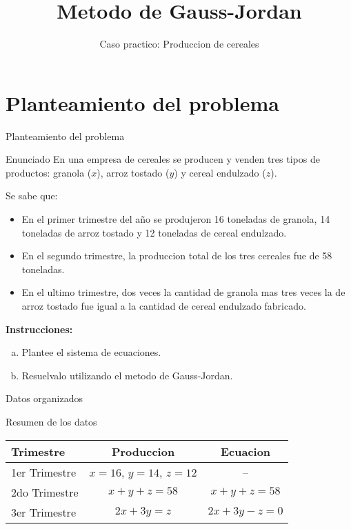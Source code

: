 \documentclass{beamer}
\title{Metodo de Gauss-Jordan}
\subtitle{Caso practico: Produccion de cereales}
\begin{document}
\section{Planteamiento del problema}

\begin{frame}{Planteamiento del problema}
\begin{block}{Enunciado}
\footnotesize
En una empresa de cereales se producen y venden tres tipos de productos: granola ($x$), arroz tostado ($y$) y cereal endulzado ($z$).

Se sabe que:
\begin{itemize}
    \item En el primer trimestre del año se produjeron 16 toneladas de granola, 14 toneladas de arroz tostado y 12 toneladas de cereal endulzado.
    \item En el segundo trimestre, la produccion total de los tres cereales fue de 58 toneladas.
    \item En el ultimo trimestre, dos veces la cantidad de granola mas tres veces la de arroz tostado fue igual a la cantidad de cereal endulzado fabricado.
\end{itemize}

\textbf{Instrucciones:}
\begin{enumerate}[a.]
    \item Plantee el sistema de ecuaciones.
    \item Resuelvalo utilizando el metodo de Gauss-Jordan.
\end{enumerate}
\end{block}
\end{frame}

\begin{frame}{Datos organizados}
\begin{block}{Resumen de los datos}
\begin{table}[h]
\centering
\renewcommand{\arraystretch}{1.4}
\begin{tabular}{lcc}
\toprule
\textbf{Trimestre} & \textbf{Produccion} & \textbf{Ecuacion} \\
\midrule
1er Trimestre & $x=16$, $y=14$, $z=12$ & -- \\
2do Trimestre & $x+y+z=58$ & $x + y + z = 58$ \\
3er Trimestre & $2x + 3y = z$ & $2x + 3y - z = 0$ \\
\bottomrule
\end{tabular}
\end{table}
\end{block}
\end{frame}
\end{document}
